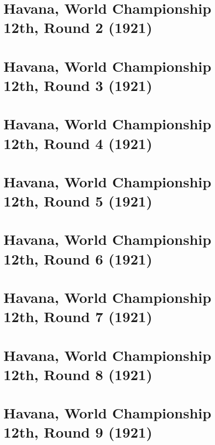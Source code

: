 \documentclass[11pt]{article}
\begin{document}
\clearpage

\section{Havana, World Championship 12th, Round 2 (1921)}


\clearpage

\section{Havana, World Championship 12th, Round 3 (1921)}


\clearpage

\section{Havana, World Championship 12th, Round 4 (1921)}


\clearpage

\section{Havana, World Championship 12th, Round 5 (1921)}


\clearpage

\section{Havana, World Championship 12th, Round 6 (1921)}


\clearpage

\section{Havana, World Championship 12th, Round 7 (1921)}


\clearpage

\section{Havana, World Championship 12th, Round 8 (1921)}


\clearpage

\section{Havana, World Championship 12th, Round 9 (1921)}

\end{document}

